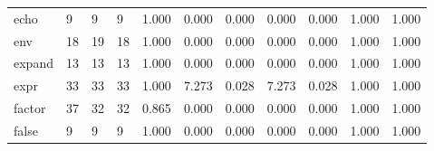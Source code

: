 \begin{longtable}{lp{1.2cm}p{1.2cm}p{1.2cm}p{1.2cm}p{1.2cm}p{1.2cm}p{1.2cm}p{1.2cm}p{1.2cm}p{1.2cm}}
echo      &                            9 &                  9 &                                 9 &                                      1.000 &                                  0.000 &                                        0.000 &                             0.000 &                                   0.000 &                              1.000 &                                              1.000 \\
env       &                           18 &                 19 &                                18 &                                      1.000 &                                  0.000 &                                        0.000 &                             0.000 &                                   0.000 &                              1.000 &                                              1.000 \\
expand    &                           13 &                 13 &                                13 &                                      1.000 &                                  0.000 &                                        0.000 &                             0.000 &                                   0.000 &                              1.000 &                                              1.000 \\
expr      &                           33 &                 33 &                                33 &                                      1.000 &                                  7.273 &                                        0.028 &                             7.273 &                                   0.028 &                              1.000 &                                              1.000 \\
factor    &                           37 &                 32 &                                32 &                                      0.865 &                                  0.000 &                                        0.000 &                             0.000 &                                   0.000 &                              1.000 &                                              1.000 \\
false     &                            9 &                  9 &                                 9 &                                      1.000 &                                  0.000 &                                        0.000 &                             0.000 &                                   0.000 &                              1.000 &                                              1.000 \\

\end{longtable}
